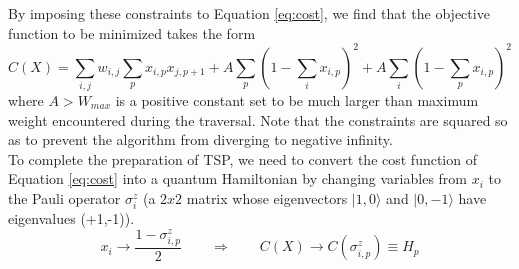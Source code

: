 By imposing these constraints to Equation \ref{eq:cost}, we find that the objective function to be minimized takes the form
\begin{equation}
	C(X)=\sum_{i,j}w_{i,j} \sum_p x_{i,p}x_{j,p+1} + A\sum_p (1 - \sum_i x_{i,p})^2 + A\sum_i (1 - \sum_p x_{i,p})^2
	\label{eq:hamiltoniancircuit}
\end{equation}
where $A>W_{max}$ is a positive constant set to be much larger than maximum weight encountered during the traversal. Note that the constraints are squared so as to prevent the algorithm from diverging to negative infinity. \\

To complete the preparation of TSP, we need to convert the cost function of Equation \ref{eq:cost} into a quantum Hamiltonian by changing variables from $x_i$ to the Pauli operator $\sigma_i^z$ (a $2x2$ matrix whose eigenvectors $|1,0\rangle$ and $|0,-1\rangle$ have eigenvalues (+1,-1)). 
\begin{equation}
	x_i \rightarrow \frac{ 1-\sigma_{i,p}^z}{2} \qquad \Rightarrow \qquad C(X) \rightarrow C(\sigma_{i,p}^z) \equiv H_p
	\label{eq:transformation}
\end{equation}